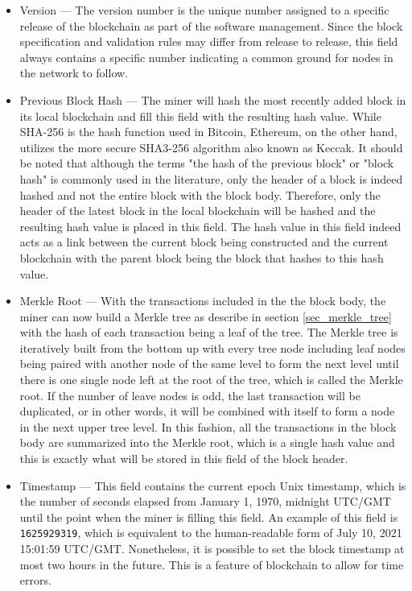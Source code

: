 \begin{itemize}
	\item Version --- The version number is the unique number assigned to a specific release of the blockchain as part of the software management. Since the block specification and validation rules may differ from release to release, this field always contains a specific number indicating a common ground for nodes in the network to follow.
	
	\item Previous Block Hash --- The miner will hash the most recently added block in its local blockchain and fill this field with the resulting hash value. While SHA-256 is the hash function used in Bitcoin, Ethereum, on the other hand, utilizes the more secure SHA3-256 algorithm also known as Keccak. It should be noted that although the terms "the hash of the previous block" or "block hash" is commonly used in the literature, only the header of a block is indeed hashed and not the entire block with the block body. Therefore, only the header of the latest block in the local blockchain will be hashed and the resulting hash value is placed in this field. The hash value in this field indeed acts as a link between the current block being constructed and the current blockchain with the parent block being the block that hashes to this hash value.
	
	\item Merkle Root ---  With the transactions included in the the block body, the miner can now build a Merkle tree as describe in section \ref{sec_merkle_tree} with the hash of each transaction being a leaf of the tree. The Merkle tree is iteratively built from the bottom up with every tree node including leaf nodes being paired with another node of the same level to form the next level until there is one single node left at the root of the tree, which is called the Merkle root. If the number of leave nodes is odd, the last transaction will be duplicated, or in other words, it will be combined with itself to form a node in the next upper tree level. In this fashion, all the transactions in the block body are summarized into the Merkle root, which is a single hash value and this is exactly what will be stored in this field of the block header.
	
	\item Timestamp --- This field contains the current epoch Unix timestamp, which is the number of seconds elapsed from January 1, 1970, midnight UTC/GMT until the point when the miner is filling this field. An example of this field is \texttt{1625929319}, which is equivalent to the human-readable form of July 10, 2021 15:01:59 UTC/GMT. Nonetheless, it is possible to set the block timestamp at most two hours in the future. This is a feature of blockchain to allow for time errors.  


\end{itemize}
